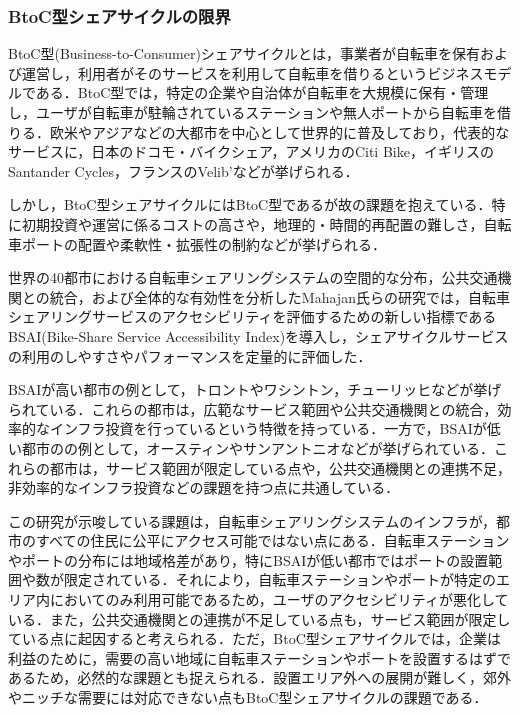       \subsubsection{BtoC型シェアサイクルの限界}
        \label{sec:BtoC型シェアサイクルの限界}
          \par BtoC型(Business-to-Consumer)シェアサイクルとは，事業者が自転車を保有および運営し，利用者がそのサービスを利用して自転車を借りるというビジネスモデルである．BtoC型では，特定の企業や自治体が自転車を大規模に保有・管理し，ユーザが自転車が駐輪されているステーションや無人ポートから自転車を借りる．欧米やアジアなどの大都市を中心として世界的に普及しており，代表的なサービスに，日本のドコモ・バイクシェア，アメリカのCiti Bike，イギリスのSantander Cycles，フランスのVelib’などが挙げられる．
          \par しかし，BtoC型シェアサイクルにはBtoC型であるが故の課題を抱えている．特に初期投資や運営に係るコストの高さや，地理的・時間的再配置の難しさ，自転車ポートの配置や柔軟性・拡張性の制約などが挙げられる．
          \par 世界の40都市における自転車シェアリングシステムの空間的な分布，公共交通機関との統合，および全体的な有効性を分析したMahajan氏らの研究では，自転車シェアリングサービスのアクセシビリティを評価するための新しい指標であるBSAI(Bike-Share Service Accessibility Index)を導入し，シェアサイクルサービスの利用のしやすさやパフォーマンスを定量的に評価した．
          \par BSAIが高い都市の例として，トロントやワシントン，チューリッヒなどが挙げられている．これらの都市は，広範なサービス範囲や公共交通機関との統合，効率的なインフラ投資を行っているという特徴を持っている．一方で，BSAIが低い都市のの例として，オースティンやサンアントニオなどが挙げられている．これらの都市は，サービス範囲が限定している点や，公共交通機関との連携不足，非効率的なインフラ投資などの課題を持つ点に共通している．
          \par この研究が示唆している課題は，自転車シェアリングシステムのインフラが，都市のすべての住民に公平にアクセス可能ではない点にある．自転車ステーションやポートの分布には地域格差があり，特にBSAIが低い都市ではポートの設置範囲や数が限定されている．それにより，自転車ステーションやポートが特定のエリア内においてのみ利用可能であるため，ユーザのアクセシビリティが悪化している．また，公共交通機関との連携が不足している点も，サービス範囲が限定している点に起因すると考えられる．ただ，BtoC型シェアサイクルでは，企業は利益のために，需要の高い地域に自転車ステーションやポートを設置するはずであるため，必然的な課題とも捉えられる．設置エリア外への展開が難しく，郊外やニッチな需要には対応できない点もBtoC型シェアサイクルの課題である．

